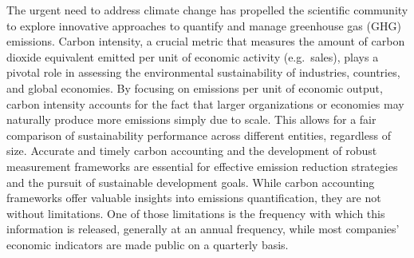 The urgent need to address climate change has propelled the scientific community to explore innovative approaches to quantify and manage greenhouse gas (GHG) emissions. Carbon intensity, a crucial metric that measures the amount of carbon dioxide equivalent emitted per unit of economic activity (e.g.~sales), plays a pivotal role in assessing the environmental sustainability of industries, countries, and global economies. By focusing on emissions per unit of economic output, carbon intensity accounts for the fact that larger organizations or economies may naturally produce more emissions simply due to scale. This allows for a fair comparison of sustainability performance across different entities, regardless of size. Accurate and timely carbon accounting and the development of robust measurement frameworks are essential for effective emission reduction strategies and the pursuit of sustainable development goals.
While carbon accounting frameworks offer valuable insights into emissions quantification, they are not without limitations. One of those limitations is the frequency with which this information is released, generally at an annual frequency, while most companies' economic indicators are made public on a quarterly basis.
